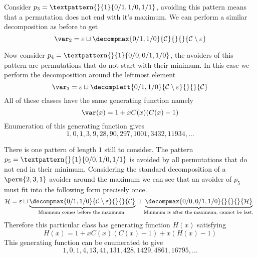 Consider \(p_3 = \textpattern{}{1}{0/1,1/0,1/1}\), avoiding this pattern
means that a permutation does not end with it's maximum. We can perform a similar
decomposition as before to get
\begin{equation*}
    \mathcal{\var}_2 =\varepsilon \sqcup \decompmax{0/1,1/0}{\mathcal{C}}{}{}{\mathcal{C}\setminus\varepsilon}
\end{equation*}

Now consider \(p_4 = \textpattern{}{1}{0/0,0/1,1/0}\), the avoiders of this
pattern are permutations that do not start with their minimum. In this case we
perform the decomposition around the leftmost element
\begin{equation*}
    \mathcal{\var}_3 =\varepsilon \sqcup \decompleft{0/1,1/0}{\mathcal{C}\setminus\varepsilon}{}{}{\mathcal{C}}
\end{equation*}
All of these classes have the same generating function namely
\begin{equation*}
    \var(x) = 1 + xC(x)(C(x)-1)
\end{equation*}
Enumeration of this generating function gives
\begin{equation*}
    1, 0, 1, 3, 9, 28, 90, 297, 1001, 3432, 11934,\dotsc
\end{equation*}

There is one pattern of length \(1\) still to consider. The pattern
\(p_5 = \textpattern{}{1}{0/0,1/0,1/1}\) is avoided by all permutations
that do not end in their minimum. Considering the standard decomposition
of a \(\perm{2,3,1}\) avoider around the maximum we can see that an avoider
of \(p_5\) must fit into the following form precisely once.
\begin{equation*}
    \mathcal{H} = \varepsilon \sqcup
    \underbrace{\decompmax{0/1,1/0}{\mathcal{C}\setminus\varepsilon}{}{}{\mathcal{C}}}_\text{
        Minimum comes before the maximum.
    } \sqcup
    \underbrace{\decompmax{0/0,0/1,1/0}{}{}{}{\mathcal{H}}}_\text{
        Minimum is after the maximum, cannot be last.
    }
\end{equation*}
Therefore this particular class has generating function \(H(x)\) satisfying
\begin{equation*}
    H(x) = 1 + xC(x)(C(x)-1) + x(H(x)-1)
\end{equation*}
This generating function can be enumerated to give
\begin{equation*}
    	1, 0, 1, 4, 13, 41, 131, 428, 1429, 4861, 16795,\dotsc
\end{equation*}

